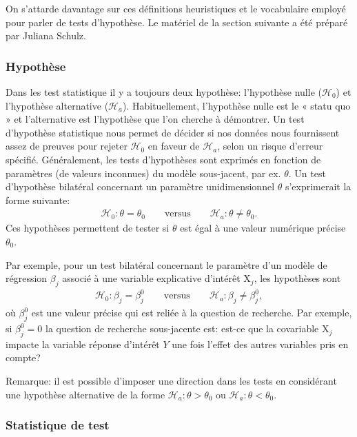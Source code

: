 \documentclass[
  11pt,
  letterpaper,
]{article}
\theoremstyle{definition}
\theoremstyle{definition}
\theoremstyle{definition}
\theoremstyle{definition}
\theoremstyle{remark}
\begin{document}
On s'attarde davantage sur ces définitions heuristiques et le vocabulaire employé pour parler de tests d'hypothèse. Le matériel de la section suivante a été préparé par Juliana Schulz.

\hypertarget{hypothuxe8se}{%
\subsubsection{Hypothèse}\label{hypothuxe8se}}

Dans les test statistique il y a toujours deux hypothèse: l'hypothèse nulle (\(\mathscr{H}_{0}\)) et l'hypothèse alternative (\(\mathscr{H}_a\)). Habituellement, l'hypothèse nulle est le « statu quo » et l'alternative est l'hypothèse que l'on cherche à démontrer. Un test d'hypothèse statistique nous permet de décider si nos données nous fournissent assez de preuves pour rejeter \(\mathscr{H}_0\) en faveur de \(\mathscr{H}_a\), selon un risque d'erreur spécifié. Généralement, les tests d'hypothèses sont exprimés en fonction de paramètres (de valeurs inconnues) du modèle sous-jacent, par ex. \(\theta\). Un test d'hypothèse bilatéral concernant un paramètre unidimensionnel \(\theta\) s'exprimerait la forme suivante:
\begin{align*}
\mathscr{H}_0: \theta=\theta_0 \qquad \text{versus} \qquad \mathscr{H}_a:\theta \neq \theta_0.
\end{align*}
Ces hypothèses permettent de tester si \(\theta\) est égal à une valeur numérique précise \(\theta_0\).

Par exemple, pour un test bilatéral concernant le paramètre d'un modèle de régression \(\beta_j\) associé à une variable explicative d'intérêt \(\mathrm{X}_j\), les hypothèses sont
\begin{align*}
\mathscr{H}_0: \beta_j=\beta_j^0 \qquad \text{versus} \qquad \mathscr{H}_a:\beta_j \neq \beta_j^0,
\end{align*}
où \(\beta_j^0\) est une valeur précise qui est reliée à la question de recherche. Par exemple, si \(\beta_j^0=0\) la question de recherche sous-jacente est: est-ce que la covariable \(\mathrm{X}_j\) impacte la variable réponse d'intérêt \(Y\) une fois l'effet des autres variables pris en compte?

Remarque: il est possible d'imposer une direction dans les tests en considérant une hypothèse alternative de la forme \(\mathscr{H}_a: \theta > \theta_0\) ou \(\mathscr{H}_a: \theta < \theta_0\).

\hypertarget{statistique-de-test}{%
\subsubsection{Statistique de test}\label{statistique-de-test}}
\end{document}
